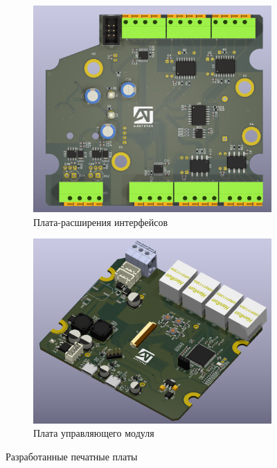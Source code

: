 \documentclass[16pt]{article}
\begin{document}
\begin{figure}
    \centering
    \begin{subfigure}{0.45\textwidth}
        \includegraphics[width=\textwidth]{interface.png}
        \caption{Плата-расширения интерфейсов}
        \label{fig:interface_board}
    \end{subfigure}
    \hfill
    \begin{subfigure}{0.45\textwidth}
        \includegraphics[width=\textwidth]{control.png}
        \caption{Плата управляющего модуля}
        \label{fig:plc_board}
    \end{subfigure}
    \caption{Разработанные печатные платы}
\end{figure}
\end{document}
